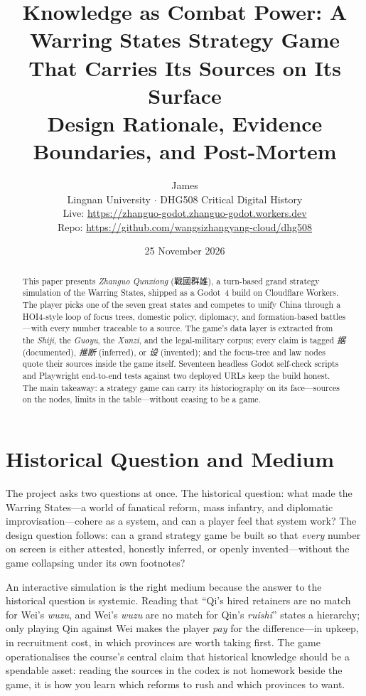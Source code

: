 \documentclass[12pt,a4paper]{article}
\title{\textbf{Knowledge as Combat Power: A Warring States Strategy Game That Carries Its Sources on Its Surface}\\[0.3em]
\large Design Rationale, Evidence Boundaries, and Post-Mortem}
\author{James\\Lingnan University $\cdot$ DHG508 Critical Digital History\\
\footnotesize Live: \url{https://zhanguo-godot.zhanguo-godot.workers.dev}\\
\footnotesize Repo: \url{https://github.com/wangsizhangyang-cloud/dhg508}}
\date{25 November 2026}
\begin{document}
\maketitle

\begin{abstract}
\noindent
This paper presents \emph{Zhanguo Qunxiong} (戰國群雄), a turn-based grand
strategy simulation of the Warring States, shipped as a Godot~4 build on
Cloudflare Workers. The player picks one of the seven great states and
competes to unify China through a HOI4-style loop of focus trees, domestic
policy, diplomacy, and formation-based battles---with every number traceable
to a source. The game's data layer is extracted from the \emph{Shiji}, the
\emph{Guoyu}, the \emph{Xunzi}, and the legal-military corpus; every claim is
tagged \emph{据} (documented), \emph{推断} (inferred), or \emph{设}
(invented); and the focus-tree and law nodes quote their sources inside the
game itself. Seventeen headless Godot self-check scripts and Playwright
end-to-end tests against two deployed URLs keep the build honest. The main
takeaway: a strategy game can carry its historiography on its face---sources
on the nodes, limits in the table---without ceasing to be a game.
\end{abstract}

\onehalfspacing

\section{Historical Question and Medium}

The project asks two questions at once. The historical question: what made
the Warring States---a world of fanatical reform, mass infantry, and
diplomatic improvisation---cohere as a system, and can a player feel that
system work? The design question follows: can a grand strategy game be built
so that \emph{every} number on screen is either attested, honestly inferred,
or openly invented---without the game collapsing under its own footnotes?

An interactive simulation is the right medium because the answer to the
historical question is systemic. Reading that ``Qi's hired retainers are no
match for Wei's \emph{wuzu}, and Wei's \emph{wuzu} are no match for Qin's
\emph{ruishi}''\autocite{xunzi} states a hierarchy; only playing Qin against
Wei makes the player \emph{pay} for the difference---in upkeep, in recruitment
cost, in which provinces are worth taking first. The game operationalises the
course's central claim that historical knowledge should be a spendable asset:
reading the sources in the codex is not homework beside the game, it is how
you learn which reforms to rush and which provinces to want.
\end{document}
